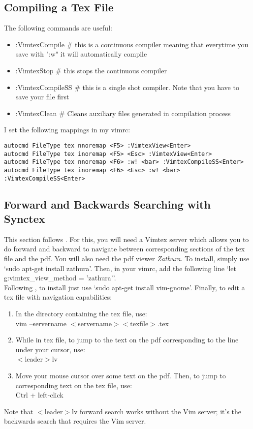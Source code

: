 \documentclass[10pt]{article}
\newcommand{\tlangle}{$<$}
\newcommand{\trangle}{$>$}
\begin{document}
\subsection{Compiling a Tex File}
The following commands are useful:
\begin{itemize}
    \item :VimtexCompile \# this is a continuous compiler meaning that everytime you save with ":w" it will
        automatically compile
    \item :VimtexStop \# this stops the continuous compiler
    \item :VimtexCompileSS \# this is a single shot compiler. Note that you have to save your file first
    \item :VimtexClean \# Cleans auxiliary files generated in compilation process 
\end{itemize}
I set the following mappings in my vimrc:
\begin{lstlisting}
autocmd FileType tex nnoremap <F5> :VimtexView<Enter>
autocmd FileType tex inoremap <F5> <Esc> :VimtexView<Enter>
autocmd FileType tex nnoremap <F6> :w! <bar> :VimtexCompileSS<Enter>
autocmd FileType tex inoremap <F6> <Esc> :w! <bar> :VimtexCompileSS<Enter>
\end{lstlisting}

\subsection{Forward and Backwards Searching with Synctex}
This section follows \cite{gunther2014vimtex}. For this, you will need a Vimtex server which allows you to do
forward and backward to navigate between corresponding sections of the tex file and the pdf. You will also need
the pdf viewer \textit{Zathura}. To install, simply use `sudo apt-get install zathura'. Then, in your vimrc, add the
following line `let g:vimtex\_view\_method = 'zathura''.\\

Following \cite{lerner2004enable}, to install just use `sudo apt-get install vim-gnome'. Finally, to edit a tex file
with navigation capabilities:
\begin{enumerate}
    \item In the directory containing the tex file, use:\\
        vim --servername \tlangle servername\trangle \tlangle texfile\trangle.tex
    \item While in tex file, to jump to the text on the pdf corresponding to the line under your cursor, use:\\
        \tlangle leader\trangle lv
    \item Move your mouse cursor over some text on the pdf. Then, to jump to corresponding text on the tex file, use:\\
        Ctrl + left-click
\end{enumerate}
Note that \tlangle leader\trangle lv forward search works without the Vim server; it's the backwards search that requires the Vim server.
\end{document}
